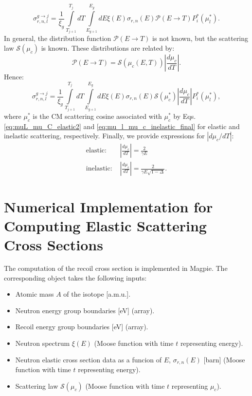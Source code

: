 \documentclass[review]{elsarticle}
\begin{document}
\begin{equation}\label{eq:sigma_coefficient3}
   \sigma_{r,n,l}^{g \rightarrow j} = \frac{1}{\xi_g}\int\limits_{T_{j+1}}^{T_j} dT \int\limits_{E_{g+1}}^{E_g} dE  \xi(E)   \sigma_{r,n}(E) \mathcal{P}(E \rightarrow T) P^*_i(\mu_l^*).
\end{equation}
In general, the distribution function $\mathcal{P}(E \rightarrow T)$ is not known, but the scattering law $\mathcal{S}(\mu_c)$ is known. These distributions are related by:
\begin{equation}
 \mathcal{P} (E \rightarrow T) = \mathcal{S}(\mu_c(E,T)) \left|  \frac{d \mu_c}{ dT} \right |.
\end{equation}
Hence:
\begin{equation}\label{eq:sigma_coefficient4}
   \sigma_{r,n,l}^{g \rightarrow j} = \frac{1}{\xi_g}\int\limits_{T_{j+1}}^{T_j} dT \int\limits_{E_{g+1}}^{E_g} dE  \xi(E)   \sigma_{r,n}(E) \mathcal{S}(\mu_c^*) \left|  \frac{d \mu_c}{ dT} \right | P^*_i(\mu_l^*),
\end{equation}
where $\mu_c^*$ is the CM scattering cosine associated with $\mu_c^*$ by Eqs.  \ref{eq:muL_mu_C_elastic2} and \ref{eq:mu_l_mu_c_inelastic_final} for elastic and inelastic scattering, respectively.
Finally, we provide expressions for $\left|  d \mu_c / dT \right |$:
\begin{align}
  \text{elastic: }&      \left|  \frac{d \mu_c}{ dT} \right | = \frac{2}{\gamma E} \nonumber \\
   \text{inelastic: }&  \left|  \frac{d \mu_c}{ dT} \right | = \frac{2}{\gamma E \sqrt{1 - \Delta}} .
\end{align}

\section{Numerical Implementation for Computing Elastic Scattering Cross Sections}

The computation of the recoil cross section is implemented in Magpie. The corresponding object takes the following inputs:

\begin{itemize}
 	\item Atomic mass $A$ of the isotope [a.m.u.]. 
	 \item Neutron energy group boundaries [eV] (array).
	 \item Recoil energy group boundaries [eV] (array).
	 \item Neutron spectrum $\xi(E)$ (Moose function with time $t$ representing energy).
	 \item Neutron elastic cross section data as a funcion of $E$, $ \sigma_{r,n}(E)$  [barn] (Moose function with time $t$ representing energy).
	 \item Scattering law $\mathcal{S}(\mu_c)$ (Moose function with time $t$ representing $\mu_c$).
\end{itemize}
\end{document}
